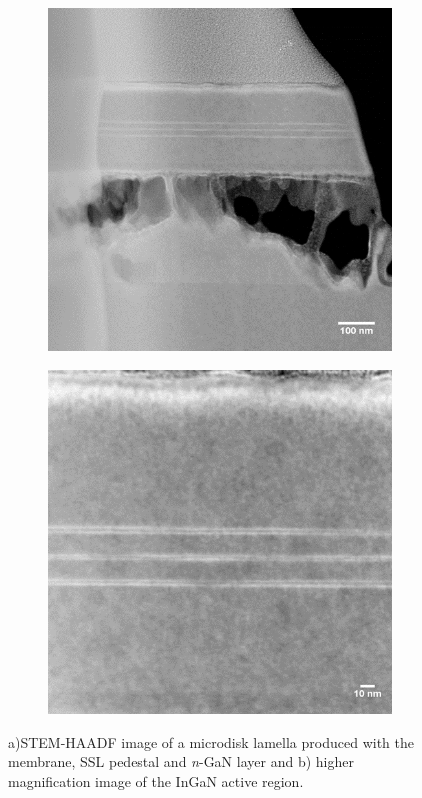 \begin{figure}[h]
	
	\begin{subfigure}[b]{0.48\textwidth}
		\centering
		\includegraphics[width=1\linewidth]{Figs/Ch4/microped}
		\caption{}
		
	\end{subfigure}%
	\hspace*{0.5cm}
	\begin{subfigure}[b]{0.48\textwidth}
		\centering
		\includegraphics[width=1\linewidth]{Figs/Ch4/micropedzoom}
		\caption{}
	\end{subfigure}%
	
	\caption{a)STEM-HAADF image of a microdisk lamella produced with the membrane, SSL pedestal and \textit{n}-GaN layer and b) higher magnification image of the InGaN active region.}
	\label{pedestal}
\end{figure}

